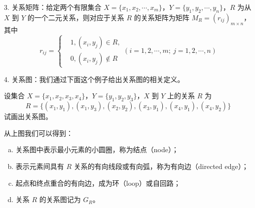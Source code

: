 \documentclass[normal,cyan]{elegantnote}
\begin{document}
3. 关系矩阵：给定两个有限集合 $X = \{x_1, x_2, \cdots, x_m\}$，$Y = \{y_1, y_2, \cdots, y_n\}$，$R$ 为从 $X$ 到 $Y$ 的一个二元关系，则对应于关系 $R$ 的{\color{red}关系矩阵}为矩阵 $M_R = (r_{ij})_{m \times n}$，其中
\begin{equation}\nonumber
    r_{ij} =  \left\{  \begin{aligned}&1, (x_i, y_j) \in R, \\ &0, (x_i, y_j) \notin R\end{aligned}\right.(i = 1, 2, \cdots, m;\ j = 1, 2, \cdots, n)
\end{equation}

4. 关系图：我们通过下面这个例子给出关系图的相关定义。
\begin{example}
    设集合 $X = \{x_1, x_2, x_3, x_4\}$，$Y = \{y_1, y_2, y_3\}$，$X$ 到 $Y$ 上的关系 $R$ 为 $$R = \{(x_1, y_1), (x_1, y_3), (x_2, y_2), (x_3, y_1), (x_4, y_1), (x_4, y_2)\}$$
    试画出关系图。
\end{example}
\begin{center}
\end{center}

从上图我们可以得到：
\begin{enumerate}[a)]
    \item 关系图中表示最小元素的小圆圈，称为{\color{red}结点}（node）；
    \item 表示元素间具有 $R$ 关系的{\color{red}有向线段}或{\color{red}有向弧}，称为{\color{red}有向边}（directed edge）；
    \item 起点和终点重合的有向边，成为{\color{red}环}（loop）或{\color{red}自回路}；
    \item 关系 $R$ 的关系图记为 $G_R$。
\end{enumerate}
\end{document}

